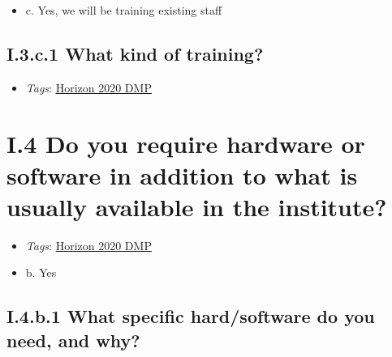 \documentclass[a4paper,12pt]{report}
\begin{document}
\begin{itemize}
  \item[\CheckmarkBold] c. Yes, we will be training existing staff
\end{itemize}




\subsection*{\protect\textcolor{colorSecId}{I.3.c.1} What kind of training?}

\label{1e85da40-bbfc-4180-903e-6c569ed2da38.83c0d09d-e74c-4c81-a52c-aaa2e18415ac.d4b4c6e3-e5c6-4938-a08a-e51cb7cdebeb.13dcbcd7-73d8-4480-8739-0a58702ced75}


\begin{itemize}
  \item \textit{Tags}: \ul{Horizon 2020 DMP}
  \end{itemize}






\section*{\protect\textcolor{colorSecId}{I.4} Do you require hardware or software in addition to what is usually available in the institute?}

\label{1e85da40-bbfc-4180-903e-6c569ed2da38.09c7c989-6461-417f-b09e-228491c051c6}


\begin{itemize}
  \item \textit{Tags}: \ul{Horizon 2020 DMP}
  \end{itemize}




\begin{itemize}
  \item[\CheckmarkBold] b. Yes
\end{itemize}




\subsection*{\protect\textcolor{colorSecId}{I.4.b.1} What specific hard/software do you need, and why?}
\end{document}
